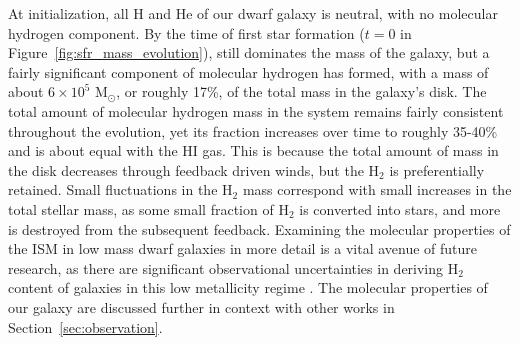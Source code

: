 \documentclass[twocolumn]{aastex61}
\begin{document}
At initialization, all H and He of our dwarf galaxy is neutral, with no molecular hydrogen component. By the time of first star formation ($t=0$ in Figure~\ref{fig:sfr_mass_evolution}),  still dominates the mass of the galaxy, but a fairly significant component of molecular hydrogen has formed, with a mass of about $6 \times 10^5$ M$_{\odot}$, or roughly 17\%, of the total mass in the galaxy's disk. The total amount of molecular hydrogen mass in the system remains fairly consistent throughout the evolution, yet its fraction increases over time to roughly 35-40\% and is about equal with the HI gas. This is because the total amount of mass in the disk decreases through feedback driven winds, but the H$_2$ is preferentially retained. Small fluctuations in the H$_2$ mass correspond with small increases in the total stellar mass, as some small fraction of H$_2$ is converted into stars, and more is destroyed from the subsequent feedback. Examining the molecular properties of the ISM in low mass dwarf galaxies in more detail is a vital avenue of future research, as there are significant observational uncertainties in deriving H$_2$ content of galaxies in this low metallicity regime \citep{Leroy2008,McQuinn2012,Amorin2016}. The molecular properties of our galaxy are discussed further in context with other works in Section~\ref{sec:observation}. 
\end{document}
